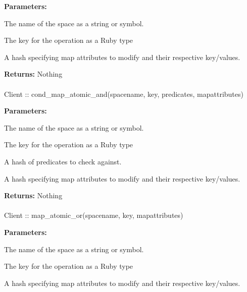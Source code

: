 \noindent\textbf{Parameters:}
\begin{description}[labelindent=\widthof{{mapattributes}},leftmargin=*,noitemsep,nolistsep,align=right]
\item[spacename] The name of the space as a string or symbol.
\item[key] The key for the operation as a Ruby type
\item[mapattributes] A hash specifying map attributes to modify and their respective key/values.
\end{description}

\noindent\textbf{Returns:}
Nothing

\paragraph{}
\begin{ccode}
Client :: cond_map_atomic_and(spacename, key, predicates, mapattributes)
\end{ccode}
\funcdesc 

\noindent\textbf{Parameters:}
\begin{description}[labelindent=\widthof{{mapattributes}},leftmargin=*,noitemsep,nolistsep,align=right]
\item[spacename] The name of the space as a string or symbol.
\item[key] The key for the operation as a Ruby type
\item[predicates] A hash of predicates to check against.
\item[mapattributes] A hash specifying map attributes to modify and their respective key/values.
\end{description}

\noindent\textbf{Returns:}
Nothing

\paragraph{}
\begin{ccode}
Client :: map_atomic_or(spacename, key, mapattributes)
\end{ccode}
\funcdesc 

\noindent\textbf{Parameters:}
\begin{description}[labelindent=\widthof{{mapattributes}},leftmargin=*,noitemsep,nolistsep,align=right]
\item[spacename] The name of the space as a string or symbol.
\item[key] The key for the operation as a Ruby type
\item[mapattributes] A hash specifying map attributes to modify and their respective key/values.
\end{description}

